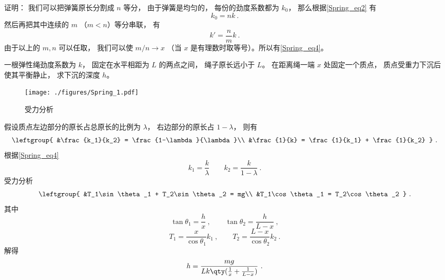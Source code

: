 证明： 我们可以把弹簧原长分割成 $n$ 等分， 由于弹簧是均匀的， 每份的劲度系数都为 $k_0$， 那么根据\autoref{Spring_eq2} 有
\begin{equation}
k_0 = nk~.
\end{equation}
然后再把其中连续的 $m$ （$m < n$）等分串联， 有
\begin{equation}
k' = \frac{n}{m}k~.
\end{equation}
由于以上的 $m, n$ 可以任取， 我们可以使 $m/n \to x$ （当 $x$ 是有理数时取等号）。所以有\autoref{Spring_eq4}。

\begin{example}{}\label{Spring_ex1}
一根弹性绳劲度系数为 $k$， 固定在水平相距为 $L$ 的两点之间， 绳子原长远小于 $L$。 在距离绳一端 $x$ 处固定一个质点， 质点受重力下沉后使其平衡静止， 求下沉的深度 $h$。
\begin{figure}[ht]
\centering
\texttt{[image: ./figures/Spring\_1.pdf]}
\caption{受力分析} \label{Spring_fig1}
\end{figure}
假设质点左边部分的原长占总原长的比例为 $\lambda$， 右边部分的原长占 $1-\lambda$， 则有
\begin{equation}
\leftgroup{
&\frac{k_1}{k_2} = \frac{1-\lambda}{\lambda}\\
&\frac{1}{k} = \frac{1}{k_1} + \frac{1}{k_2}
}~.
\end{equation}
根据\autoref{Spring_eq4} 
\begin{equation}
k_1 = \frac{k}{\lambda} \qquad
k_2 = \frac{k}{1-\lambda}~.
\end{equation}
受力分析
\begin{equation}
\leftgroup{
&T_1\sin\theta_1 + T_2\sin\theta_2 = mg\\
&T_1\cos\theta_1 = T_2\cos\theta_2
}~.
\end{equation}
其中
\begin{equation}
\tan\theta_1 = \frac{h}{x}~,
\qquad
\tan\theta_2 = \frac{h}{L-x}~,
\end{equation}
\begin{equation}
T_1 = \frac{x}{\cos\theta_1} k_1 ~,\qquad
T_2 = \frac{L-x}{\cos\theta_2} k_2~.
\end{equation}
解得
\begin{equation}
h = \frac{mg}{Lk\qty(\frac{1}{x} + \frac{1}{L-x})}~.
\end{equation}
\end{example}
